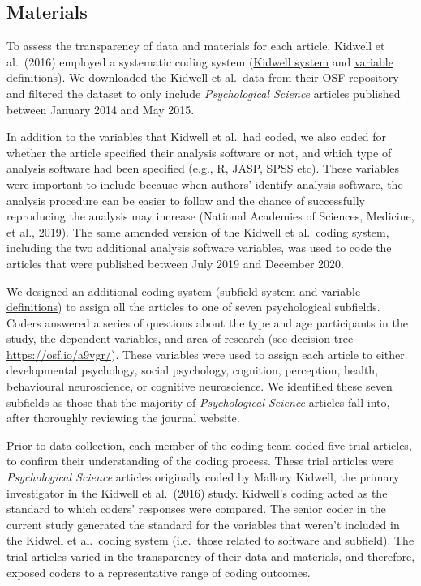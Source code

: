 \documentclass[
  english,
  man,floatsintext]{apa6}
\begin{document}
\hypertarget{materials}{%
\subsection{Materials}\label{materials}}

To assess the transparency of data and materials for each article, Kidwell et al.~(2016) employed a systematic coding system (\href{https://osf.io/j4x23/?view_only=b97cd4c4f6d645bc9e8870d97b6f3da4}{Kidwell system} and \href{https://osf.io/n7grj/?view_only=b97cd4c4f6d645bc9e8870d97b6f3da4}{variable definitions}). We downloaded the Kidwell et al.~data from their \href{https://osf.io/rfgdw/}{OSF repository} and filtered the dataset to only include \emph{Psychological Science} articles published between January 2014 and May 2015.

In addition to the variables that Kidwell et al.~had coded, we also coded for whether the article specified their analysis software or not, and which type of analysis software had been specified (e.g., R, JASP, SPSS etc). These variables were important to include because when authors' identify analysis software, the analysis procedure can be easier to follow and the chance of successfully reproducing the analysis may increase (National Academies of Sciences, Medicine, et al., 2019).
The same amended version of the Kidwell et al.~coding system, including the two additional analysis software variables, was used to code the articles that were published between July 2019 and December 2020.

We designed an additional coding system (\href{https://osf.io/a9vgr/?view_only=b97cd4c4f6d645bc9e8870d97b6f3da4}{subfield system} and \href{https://osf.io/md5eu/?view_only=b97cd4c4f6d645bc9e8870d97b6f3da4}{variable definitions}) to assign all the articles to one of seven psychological subfields. Coders answered a series of questions about the type and age participants in the study, the dependent variables, and area of research (see decision tree \url{https://osf.io/a9vgr/}). These variables were used to assign each article to either developmental psychology, social psychology, cognition, perception, health, behavioural neuroscience, or cognitive neuroscience. We identified these seven subfields as those that the majority of \emph{Psychological Science} articles fall into, after thoroughly reviewing the journal website.

Prior to data collection, each member of the coding team coded five trial articles, to confirm their understanding of the coding process. These trial articles were \emph{Psychological Science} articles originally coded by Mallory Kidwell, the primary investigator in the Kidwell et al.~(2016) study. Kidwell's coding acted as the standard to which coders' responses were compared. The senior coder in the current study generated the standard for the variables that weren't included in the Kidwell et al.~coding system (i.e.~those related to software and subfield). The trial articles varied in the transparency of their data and materials, and therefore, exposed coders to a representative range of coding outcomes.
\end{document}
